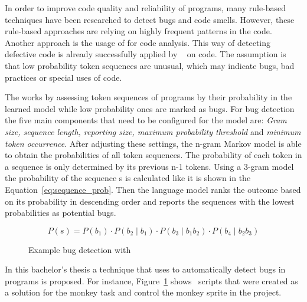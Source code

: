 In order to improve code quality and reliability of programs, many rule-based techniques have been researched to detect bugs and code smells. However, these rule-based approaches are relying on highly frequent patterns in the code. Another approach is the usage of  for code analysis. This way of detecting defective code is already successfully applied by \bugram{}~\cite{bugram} on \java{} code. The assumption is that low probability token sequences are unusual, which may indicate bugs, bad practices or special uses of code. 

The \ngram{} works by assessing token sequences of programs by their probability in the learned model while low probability ones are marked as bugs. For bug detection the five main components that need to be configured for the model are: \textit{Gram size, sequence length, reporting size, maximum probability threshold} and \textit{minimum token occurrence}. After adjusting these settings, the n-gram Markov model is able to obtain the probabilities of all token sequences. The probability of each token in a sequence is only determined by its previous n-1 tokens. Using a 3-gram model the probability of the sequence s is calculated like it is shown in the Equation~\ref{eq:sequence_prob}. Then the language model ranks the outcome based on its probability in descending order and reports the sequences with the lowest probabilities as potential bugs. 
 
\begin{equation} \label{eq:sequence_prob}
P(s) ={} P(b_{1})\cdot P(b_{2}\mid b_{1})\cdot P(b_{3}\mid b_{1}b_{2})\cdot P(b_{4}\mid b_{2}b_{3})
\end{equation}

\begin{figure}%
    \centering
    \qquad
    \caption[Example bug detection with \ngram{}]{\label{fig:exampleTokens}Example bug detection with \ngram{}}%
\end{figure}

In this bachelor's thesis a technique that uses  to automatically detect bugs in \scratch{} programs is proposed. For instance, Figure~\ref{fig:exampleTokens} shows \scratch\ scripts that were created as a solution for the monkey task and control the monkey sprite in the project. 

